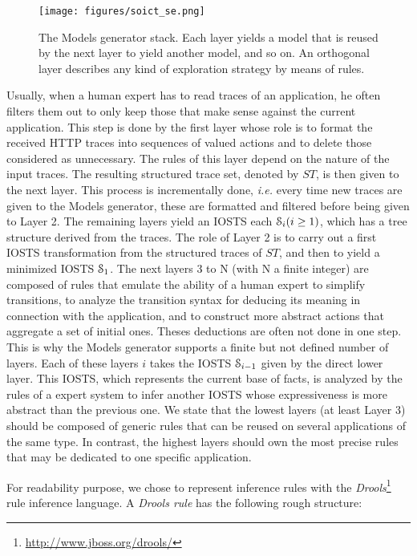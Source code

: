 \begin{figure}[ht]
    \begin{center}
        \texttt{[image: figures/soict\_se.png]}
    \end{center}

    \caption {The Models generator stack. Each layer yields a
    model that is reused by the next layer to yield another
    model, and so on. An orthogonal layer describes any kind of
    exploration strategy by means of rules.}
    \label{fig:se}
\end{figure}

Usually, when a human expert has to read traces of an
application, he often filters them out to only keep those that
make sense against the current application. This step is done by
the first layer whose role is to format the received HTTP traces
into sequences of valued actions and to delete those considered
as unnecessary. The rules of this layer depend on the nature of
the input traces. The resulting structured trace set, denoted by
$ST$, is then given to the next layer. This process is
incrementally done, \emph{i.e.} every time new traces are given to the
Models generator, these are formatted and filtered before being
given to Layer 2. The remaining layers yield an IOSTS each
$\EuScript{S}_i (i\geq 1)$, which has a tree structure derived
from the traces. The role of Layer 2 is to carry out a first
IOSTS transformation from the structured traces of $ST$, and then
to yield a minimized IOSTS $\EuScript{S}_1$. The next layers
3 to N (with N a finite integer) are composed of rules that
emulate the ability of a human expert to simplify transitions, to
analyze the transition syntax for deducing its meaning in
connection with the application, and to construct more abstract
actions that aggregate a set of initial ones. Theses deductions
are often not done in one step. This is why the Models generator
supports a finite but not defined number of layers.  Each of
these layers $i$ takes the IOSTS $\EuScript{S}_{i-1}$ given by
the direct lower layer. This IOSTS, which represents the current
base of facts, is analyzed by the rules of a expert system to
infer another IOSTS whose expressiveness is more abstract than
the previous one. We state that the lowest layers (at least Layer
3) should be composed of generic rules that can be reused on
several applications of the same type. In contrast, the highest
layers should own the most precise rules that may be dedicated to
one specific application.

For readability purpose, we chose to represent inference rules
with the
\emph{Drools}\footnote{\url{http://www.jboss.org/drools/}} rule
inference language. A \emph{Drools rule} has the following rough
structure:

